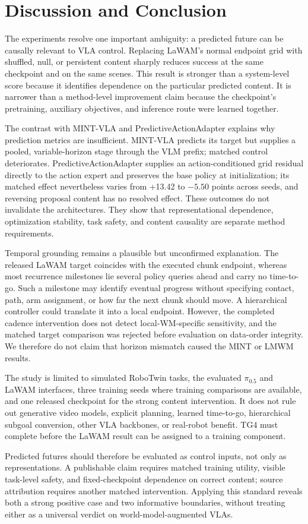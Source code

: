 \section{Discussion and Conclusion}\label{sec:conclusion}

The experiments resolve one important ambiguity: a predicted future can be
causally relevant to VLA control.  Replacing LaWAM's normal endpoint grid with
shuffled, null, or persistent content sharply reduces success at the same
checkpoint and on the same scenes.  This result is stronger than a system-level
score because it identifies dependence on the particular predicted content.
It is narrower than a method-level improvement claim because the checkpoint's
pretraining, auxiliary objectives, and inference route were learned together.

The contrast with MINT-VLA and PredictiveActionAdapter explains why prediction
metrics are insufficient.  MINT-VLA predicts its target but supplies a pooled,
variable-horizon stage through the VLM prefix; matched control deteriorates.
PredictiveActionAdapter supplies an action-conditioned grid residual directly
to the action expert and preserves the base policy at initialization; its
matched effect nevertheless varies from +13.42 to $-5.50$ points across seeds,
and reversing proposal content has no resolved effect.  These outcomes do not
invalidate the architectures.  They show that representational dependence,
optimization stability, task safety, and content causality are separate method
requirements.

Temporal grounding remains a plausible but unconfirmed explanation.  The
released LaWAM target coincides with the executed chunk endpoint, whereas most
recurrence milestones lie several policy queries ahead and carry no time-to-go.
Such a milestone may identify eventual progress without specifying contact,
path, arm assignment, or how far the next chunk should move.  A hierarchical
controller could translate it into a local endpoint.  However, the completed
cadence intervention does not detect local-WM-specific sensitivity, and the
matched target comparison was rejected before evaluation on data-order
integrity.  We therefore do not claim that horizon mismatch caused the MINT or
LMWM results.

The study is limited to simulated RoboTwin tasks, the evaluated $\pi_{0.5}$ and
LaWAM interfaces, three training seeds where training comparisons are
available, and one released checkpoint for the strong content intervention.
It does not rule out generative video models, explicit planning, learned
time-to-go, hierarchical subgoal conversion, other VLA backbones, or real-robot
benefit.  TG4 must complete before the LaWAM result can be assigned to a
training component.

Predicted futures should therefore be evaluated as control inputs, not only as
representations.  A publishable claim requires matched training utility,
visible task-level safety, and fixed-checkpoint dependence on correct content;
source attribution requires another matched intervention.  Applying this
standard reveals both a strong positive case and two informative boundaries,
without treating either as a universal verdict on world-model-augmented VLAs.
